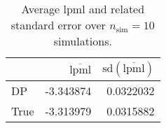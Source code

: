 \begin{table}[H]

\caption{Average lpml and related standard error over $n_{\text{sim}} = 10$ simulations.}
\centering
\begin{tabular}[t]{lrr}
\toprule
  & $\overbar{\text{lpml}}$ & $\text{sd}(\overbar{\text{lpml}})$\\
\midrule
DP & -3.343874 & 0.0322032\\
True & -3.313979 & 0.0315882\\
\bottomrule
\end{tabular}
\end{table}
